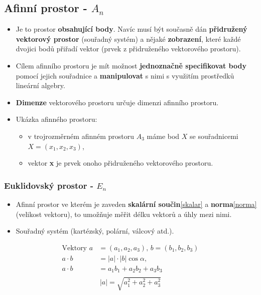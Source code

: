 \subsection{Afinní prostor - $A_n$}
\begin{itemize}
	\item Je to prostor \textbf{obsahující body}. Navíc musí být současně dán \textbf{přidružený vektorový prostor} (souřadný systém) a nějaké \textbf{zobrazení}, které každé dvojici bodů přiřadí vektor (prvek z přidruženého vektorového prostoru).
	\item Cílem afinního prostoru je mít možnost \textbf{jednoznačně specifikovat body} pomocí jejich souřadnice a \textbf{manipulovat} s nimi s využitím prostředků lineární algebry.
	\item \textbf{Dimenze} vektorového prostoru určuje dimenzi afinního prostoru.
	\item Ukázka afinného prostoru:
	\begin{itemize}
		\item v trojrozměrném afinném prostoru $A_3$ máme bod $X$ se souřadnicemi $X=(x_1,x_2,x_3)$,
		\item vektor \textbf{x} je prvek onoho přidruženého vektorového prostoru.
	\end{itemize}
\end{itemize}


\subsubsection{Euklidovský prostor - $E_n$}
\begin{itemize}
	\item Afinní prostor ve kterém je zaveden \textbf{skalární součin}\eqref{skalar} a \textbf{norma}\eqref{norma} (velikost vektoru), to umožňuje měřit délku vektorů a úhly mezi nimi.
	\item Souřadný systém (kartézský, polární, válcový atd.).
\end{itemize}
\begin{equation}
\begin{split}
\label{skalar}
\textrm{Vektory }  a &= (a_1,a_2,a_3), \, b = (b_1,b_2,b_3) \\
 a \cdot b &= |a| \cdot |b| \cos \alpha, \\
 a \cdot b &= a_1b_1 + a_2b_2 +a_3b_3 \\ 
 \end{split}
\end{equation}
\begin{equation}
\label{norma}
 |a| = \sqrt{a_1^2 + a_2^2 + a_3^2} 
\end{equation}

